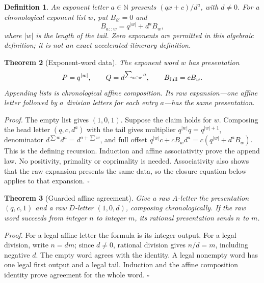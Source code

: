 \documentclass[11pt,letterpaper]{article}
\newcommand{\N}{\mathbb{N}}
\newtheorem{theorem}{Theorem}
\newtheorem{definition}[theorem]{Definition}
\newenvironment{proof}{\noindent\textit{Proof.}}{\hfill\(\square\)}
\begin{document}
\begin{definition}
An exponent letter \(a\in\N\) presents \((qx+c)/d^a\), with \(d\ne0\).
For a chronological exponent list \(w\), put \(B_{\varnothing}=0\) and
\[
B_{a::w}=q^{|w|}+d^aB_w,
\]
where \(|w|\) is the length of the tail.
Zero exponents are permitted in this algebraic definition; it is not an
exact accelerated-itinerary definition.
\end{definition}

\begin{theorem}[Exponent-word data]
The exponent word \(w\) has presentation
\[
P=q^{|w|},\qquad Q=d^{\sum_{a\in w}a},\qquad B_{\rm full}=cB_w.
\]
Appending lists is chronological affine composition. Its raw expansion---one
affine letter followed by \(a\) division letters for each entry \(a\)---has
the same presentation.
\end{theorem}
\begin{proof}
The empty list gives \((1,0,1)\). Suppose the claim holds for \(w\).
Composing the head letter \((q,c,d^a)\) with the tail gives multiplier
\(q^{|w|}q=q^{|w|+1}\), denominator
\(d^{\sum w}d^a=d^{a+\sum w}\), and full offset
\(q^{|w|}c+cB_wd^a=c(q^{|w|}+d^aB_w)\).
This is the defining recursion. Induction and affine associativity prove the
append law. No positivity, primality or coprimality is needed. Associativity
also shows that the raw expansion presents the same data, so the closure
equation below applies to that expansion.
\end{proof}

\begin{theorem}[Guarded affine agreement]
Give a raw \(A\)-letter the presentation \((q,c,1)\) and a raw \(D\)-letter
\((1,0,d)\), composing chronologically. If the raw word succeeds from integer
\(n\) to integer \(m\), its rational presentation sends \(n\) to \(m\).
\end{theorem}
\begin{proof}
For a legal affine letter the formula is its integer output. For a legal division,
write \(n=dm\); since \(d\ne0\), rational division gives \(n/d=m\), including
negative \(d\). The empty word agrees with the identity. A legal nonempty word
has one legal first output and a legal tail. Induction and the affine composition
identity prove agreement for the whole word.
\end{proof}
\end{document}
